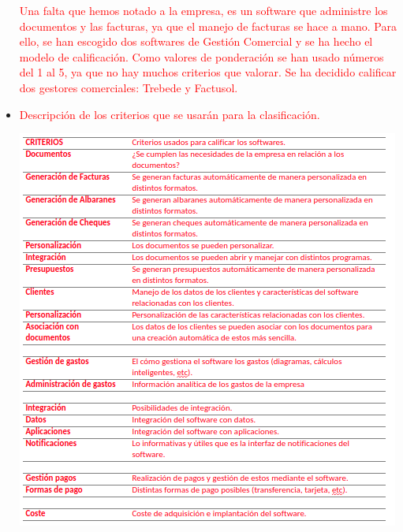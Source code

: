 \documentclass{article}
\begin{document}
\begin{itemize}
\textcolor{Red}{Una falta que hemos notado a la empresa, es un software que administre los documentos y las facturas, ya que el manejo de facturas se hace a mano. Para ello, se han escogido dos softwares de Gestión Comercial y se ha hecho el modelo de calificación. Como valores de ponderación se han usado números del 1 al 5, ya que no hay muchos criterios que valorar. Se ha decidido calificar dos gestores comerciales: Trebede y Factusol.}
\item \textcolor{Red}{Descripción de los criterios que se usarán para la clasificación.}
\begin{center}
\includegraphics[scale=0.6]{images/tabla.png}
\end{center}


\end{itemize}
\end{document}
